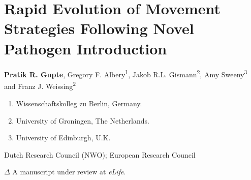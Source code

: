 \chapter{Rapid Evolution of Movement Strategies Following Novel Pathogen Introduction}\label{ch:pathomove}

{\noindent \textbf{Pratik R. Gupte}, Gregory F. Albery\textsuperscript{1}, Jakob R.L. Gismann\textsuperscript{2}, Amy Sweeny\textsuperscript{3} and Franz J. Weissing\textsuperscript{2}}

\medskip

    {\normalsize{}}

    \begin{enumerate}
        \item Wissenschaftskolleg zu Berlin, Germany.
        \item University of Groningen, The Netherlands.
        \item University of Edinburgh, U.K.
    \end{enumerate}

    \medskip

    {\normalsize{}}

    Dutch Research Council (NWO); European Research Council

    \bigskip

    {\noindent \large{$\Delta$}} A manuscript under review at \textit{eLife}.

\clearpage